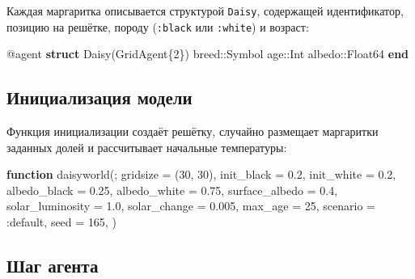 \documentclass[
  12pt,
  a4paper,
  DIV=11,
  numbers=noendperiod]{scrreprt}
\newenvironment{Shaded}{\begin{snugshade}}{\end{snugshade}}
\newcommand{\DataTypeTok}[1]{\textcolor[rgb]{0.68,0.00,0.00}{#1}}
\newcommand{\FloatTok}[1]{\textcolor[rgb]{0.68,0.00,0.00}{#1}}
\newcommand{\FunctionTok}[1]{\textcolor[rgb]{0.28,0.35,0.67}{#1}}
\newcommand{\KeywordTok}[1]{\textcolor[rgb]{0.00,0.23,0.31}{\textbf{#1}}}
\newcommand{\NormalTok}[1]{\textcolor[rgb]{0.00,0.23,0.31}{#1}}
\newcommand{\OperatorTok}[1]{\textcolor[rgb]{0.37,0.37,0.37}{#1}}
\newcommand{\PreprocessorTok}[1]{\textcolor[rgb]{0.68,0.00,0.00}{#1}}
\begin{document}
Каждая маргаритка описывается структурой \texttt{Daisy}, содержащей
идентификатор, позицию на решётке, породу (\texttt{:black} или
\texttt{:white}) и возраст:

\begin{Shaded}
\begin{Highlighting}[]
\PreprocessorTok{@agent} \KeywordTok{struct} \FunctionTok{Daisy}\NormalTok{(GridAgent\{}\FloatTok{2}\NormalTok{\})}
\NormalTok{    breed}\OperatorTok{::}\DataTypeTok{Symbol}
\NormalTok{    age}\OperatorTok{::}\DataTypeTok{Int}
\NormalTok{    albedo}\OperatorTok{::}\DataTypeTok{Float64}
\KeywordTok{end}
\end{Highlighting}
\end{Shaded}

\subsection{Инициализация
модели}\label{ux438ux43dux438ux446ux438ux430ux43bux438ux437ux430ux446ux438ux44f-ux43cux43eux434ux435ux43bux438}

Функция инициализации создаёт решётку, случайно размещает маргаритки
заданных долей и рассчитывает начальные температуры:

\begin{Shaded}
\begin{Highlighting}[]
\KeywordTok{function} \FunctionTok{daisyworld}\NormalTok{(;}
\NormalTok{    gridsize }\OperatorTok{=}\NormalTok{ (}\FloatTok{30}\NormalTok{, }\FloatTok{30}\NormalTok{),}
\NormalTok{    init\_black }\OperatorTok{=} \FloatTok{0.2}\NormalTok{,}
\NormalTok{    init\_white }\OperatorTok{=} \FloatTok{0.2}\NormalTok{,}
\NormalTok{    albedo\_black }\OperatorTok{=} \FloatTok{0.25}\NormalTok{,}
\NormalTok{    albedo\_white }\OperatorTok{=} \FloatTok{0.75}\NormalTok{,}
\NormalTok{    surface\_albedo }\OperatorTok{=} \FloatTok{0.4}\NormalTok{,}
\NormalTok{    solar\_luminosity }\OperatorTok{=} \FloatTok{1.0}\NormalTok{,}
\NormalTok{    solar\_change }\OperatorTok{=} \FloatTok{0.005}\NormalTok{,}
\NormalTok{    max\_age }\OperatorTok{=} \FloatTok{25}\NormalTok{,}
\NormalTok{    scenario }\OperatorTok{=} \OperatorTok{:}\NormalTok{default,}
\NormalTok{    seed }\OperatorTok{=} \FloatTok{165}\NormalTok{,}
\NormalTok{)}
\end{Highlighting}
\end{Shaded}

\subsection{Шаг
агента}\label{ux448ux430ux433-ux430ux433ux435ux43dux442ux430}
\end{document}
